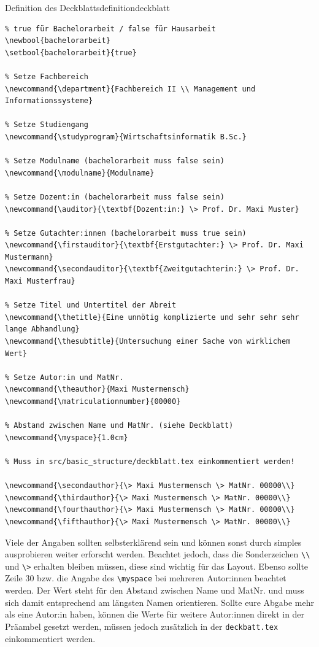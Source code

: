 \begin{code}{Definition des Deckblatts}{definitiondeckblatt}
	\begin{verbatim}
% true für Bachelorarbeit / false für Hausarbeit
\newbool{bachelorarbeit}
\setbool{bachelorarbeit}{true}

% Setze Fachbereich
\newcommand{\department}{Fachbereich II \\ Management und Informationssysteme}

% Setze Studiengang
\newcommand{\studyprogram}{Wirtschaftsinformatik B.Sc.}

% Setze Modulname (bachelorarbeit muss false sein)
\newcommand{\modulname}{Modulname}

% Setze Dozent:in (bachelorarbeit muss false sein)
\newcommand{\auditor}{\textbf{Dozent:in:} \> Prof. Dr. Maxi Muster}

% Setze Gutachter:innen (bachelorarbeit muss true sein)
\newcommand{\firstauditor}{\textbf{Erstgutachter:} \> Prof. Dr. Maxi Mustermann}
\newcommand{\secondauditor}{\textbf{Zweitgutachterin:} \> Prof. Dr. Maxi Musterfrau}

% Setze Titel und Untertitel der Abreit 
\newcommand{\thetitle}{Eine unnötig komplizierte und sehr sehr sehr lange Abhandlung}
\newcommand{\thesubtitle}{Untersuchung einer Sache von wirklichem Wert}

% Setze Autor:in und MatNr.
\newcommand{\theauthor}{Maxi Mustermensch}
\newcommand{\matriculationnumber}{00000}

% Abstand zwischen Name und MatNr. (siehe Deckblatt)
\newcommand{\myspace}{1.0cm}

% Muss in src/basic_structure/deckblatt.tex einkommentiert werden! 

\newcommand{\secondauthor}{\> Maxi Mustermensch \> MatNr. 00000\\}
\newcommand{\thirdauthor}{\> Maxi Mustermensch \> MatNr. 00000\\}
\newcommand{\fourthauthor}{\> Maxi Mustermensch \> MatNr. 00000\\}
\newcommand{\fifthauthor}{\> Maxi Mustermensch \> MatNr. 00000\\}
	\end{verbatim}
\end{code}

Viele der Angaben sollten selbsterklärend sein und können sonst durch simples
ausprobieren weiter erforscht werden. Beachtet jedoch, dass die Sonderzeichen
\texttt{\textbackslash \textbackslash} und \texttt{\textbackslash>} erhalten
bleiben müssen, diese sind wichtig für das Layout. Ebenso sollte Zeile 30 bzw.
die Angabe des \texttt{\textbackslash myspace} bei mehreren Autor:innen beachtet
werden. Der Wert steht für den Abstand zwischen Name und MatNr. und muss sich
damit entsprechend am längsten Namen orientieren. Sollte eure Abgabe mehr als
eine Autor:in haben, können die Werte für weitere Autor:innen direkt in der
Präambel gesetzt werden, müssen jedoch zusätzlich in der \texttt{deckbatt.tex}
einkommentiert werden.

